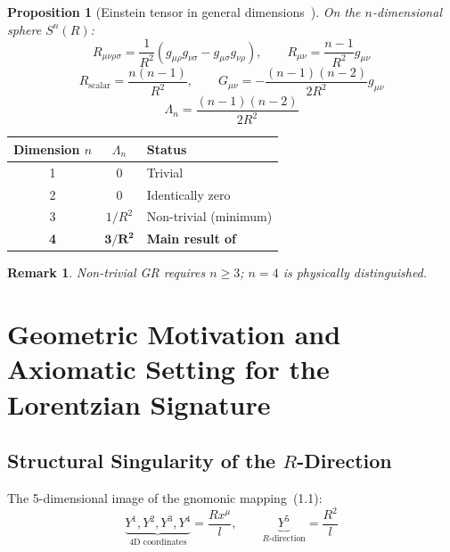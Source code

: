 \documentclass[12pt,a4paper]{article}
\newtheorem{proposition}[theorem]{Proposition}
\newtheorem*{remark}{Remark}
\begin{document}
\begin{proposition}[Einstein tensor in general dimensions~{\rm\cite{doCarmo1992,Wald1984}}]\label{prop:general}
On the $n$-dimensional sphere $S^n(R)$:
\begin{equation}
R_{\mu\nu\rho\sigma} = \frac{1}{R^2}(g_{\mu\rho}g_{\nu\sigma} - g_{\mu\sigma}g_{\nu\rho}), \qquad R_{\mu\nu} = \frac{n-1}{R^2}g_{\mu\nu} \tag{2.1}
\end{equation}
\begin{equation}
R_{\text{scalar}} = \frac{n(n-1)}{R^2}, \qquad G_{\mu\nu} = -\frac{(n-1)(n-2)}{2R^2}g_{\mu\nu} \tag{2.2}
\end{equation}
\begin{equation}
\Lambda_n = \frac{(n-1)(n-2)}{2R^2} \tag{2.3}
\end{equation}
\end{proposition}

\begin{center}
\begin{tabular}{ccl}
\toprule
Dimension $n$ & $\Lambda_n$ & Status \\
\midrule
1 & 0 & Trivial \\
2 & 0 & Identically zero \\
3 & $1/R^2$ & Non-trivial (minimum) \\
\textbf{4} & $\mathbf{3/R^2}$ & \textbf{Main result of~\cite{Paper1}} \\
\bottomrule
\end{tabular}
\end{center}

\begin{remark}
Non-trivial GR requires $n \geq 3$; $n = 4$ is physically distinguished.
\end{remark}

\section{Geometric Motivation and Axiomatic Setting for the Lorentzian Signature}

\subsection{Structural Singularity of the $R$-Direction}

The 5-dimensional image of the gnomonic mapping~(1.1):
\[
\underbrace{Y^1, Y^2, Y^3, Y^4}_{\text{4D coordinates}} = \frac{Rx^\mu}{l}, \qquad \underbrace{Y^5}_{\text{$R$-direction}} = \frac{R^2}{l}
\]
\end{document}
